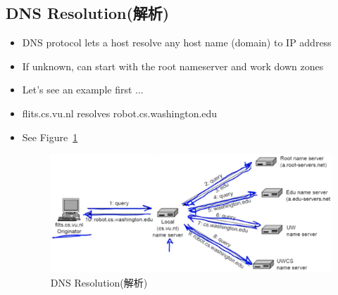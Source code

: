 \documentclass[12pt]{ctexart}   %
\begin{document}
	\subsection{DNS Resolution(解析)}
	\begin{itemize}
		\item DNS protocol lets a host resolve any host name (domain) to IP address
		\item If unknown, can start with the root nameserver and work down zones
		\item Let's see an example first ...
		
		\item flits.cs.vu.nl resolves robot.cs.washington.edu
		\item See Figure~\ref{fig:8-3-2}
		  
		 \begin{figure}[h!] %
		\centering
		 \includegraphics[scale=0.7]{images/8-3-2}
		\caption{ DNS Resolution(解析) }
		 \label{fig:8-3-2}
		 \end{figure}
	\end{itemize}
	
\end{document}

